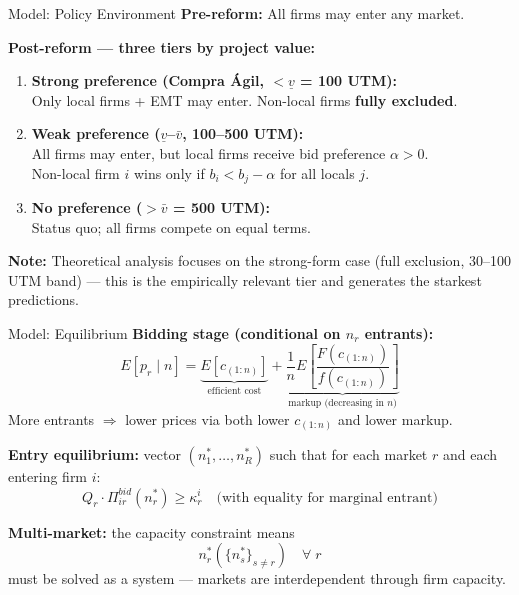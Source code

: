 \documentclass[9pt,aspectratio=169]{beamer}
\begin{document}
\begin{frame}{Model: Policy Environment}
\textbf{Pre-reform:} All firms may enter any market.

\bigskip
\textbf{Post-reform --- three tiers by project value:}

\medskip
\begin{enumerate}
  \item \textbf{Strong preference (Compra Ágil, $< \underline{v}$ = 100 UTM):}\\
        Only local firms + EMT may enter. Non-local firms \textbf{fully excluded}.

  \vspace{0.5em}
  \item \textbf{Weak preference ($\underline{v}$--$\bar{v}$, 100--500 UTM):}\\
        All firms may enter, but local firms receive bid preference $\alpha > 0$.\\
        Non-local firm $i$ wins only if $b_i < b_j - \alpha$ for all locals $j$.

  \vspace{0.5em}
  \item \textbf{No preference ($> \bar{v}$ = 500 UTM):}\\
        Status quo; all firms compete on equal terms.
\end{enumerate}

\bigskip
\small\textbf{Note:} Theoretical analysis focuses on the strong-form case
(full exclusion, 30--100 UTM band) --- this is the empirically relevant tier
and generates the starkest predictions.
\end{frame}

\begin{frame}{Model: Equilibrium}
\textbf{Bidding stage (conditional on $n_r$ entrants):}
\[
  E[p_r \mid n]
    = \underbrace{E[c_{(1:n)}]}_{\text{efficient cost}}
    + \underbrace{\frac{1}{n} E\!\left[\frac{F(c_{(1:n)})}{f(c_{(1:n)})}\right]}_{\text{markup (decreasing in }n)}
\]
More entrants $\Rightarrow$ lower prices via both lower $c_{(1:n)}$ and lower markup.

\bigskip
\textbf{Entry equilibrium:} vector $(n_1^*, \dots, n_R^*)$ such that
for each market $r$ and each entering firm $i$:
\[
  Q_r \cdot \Pi_{ir}^{bid}(n_r^*) \geq \kappa_r^i
  \quad \text{(with equality for marginal entrant)}
\]

\medskip
\textbf{Multi-market:} the capacity constraint means
\[
  n_r^*\!\left(\{n_s^*\}_{s \neq r}\right) \quad \forall\; r
\]
must be solved as a system --- markets are interdependent through firm capacity.
\end{frame}
\end{document}
